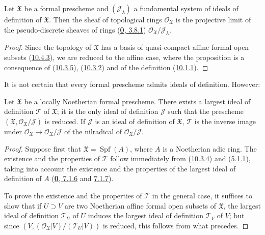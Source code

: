 \begin{proposition}[10.5.3]
\label{I.10.5.3}
Let $\mathfrak{X}$ be a formal prescheme and $(\mathscr{J}_\lambda)$ a
fundamental system of ideals of definition of $\mathfrak{X}$. Then the
sheaf of topological rings $\mathscr{O}_{\mathfrak{X}}$ is the projective
limit of the pseudo-discrete sheaves of rings
\textup{(\hyperref[0.3.8.1]{\textbf{0}, 3.8.1})}
$\mathscr{O}_{\mathfrak{X}}/\mathscr{J}_\lambda$.
\end{proposition}

\begin{proof}
Since the topology of $\mathfrak{X}$ has a basis of quasi-compact affine
formal open subsets (\hyperref[I.10.4.3]{10.4.3}), we are reduced to the
affine case, where the proposition is a consequence of
(\hyperref[I.10.3.5]{10.3.5}),
(\hyperref[I.10.3.2]{10.3.2}) and of the definition
(\hyperref[I.10.1.1]{10.1.1}).
\end{proof}

It is not certain that every formal prescheme admits ideals of
definition. However:

\begin{proposition}[10.5.4]
\label{I.10.5.4}
Let $\mathfrak{X}$ be a locally Noetherian formal prescheme. There exists
a largest ideal of definition $\mathscr{T}$ of $\mathfrak{X}$;
it is the only ideal of definition $\mathscr{J}$ such that the prescheme
$(\mathfrak{X},\mathscr{O}_{\mathfrak{X}}/\mathscr{J})$ is reduced. If
$\mathscr{J}$ is an ideal of definition of $\mathfrak{X}$,
$\mathscr{T}$ is the inverse image under
$\mathscr{O}_{\mathfrak{X}}\to
\mathscr{O}_{\mathfrak{X}}/\mathscr{J}$ of the nilradical of
$\mathscr{O}_{\mathfrak{X}}/\mathscr{J}$.
\end{proposition}

\begin{proof}
Suppose first that $\mathfrak{X}=\operatorname{Spf}(A)$, where $A$ is
a Noetherian adic ring. The existence and the properties of
$\mathscr{T}$ follow immediately from
(\hyperref[I.10.3.4]{10.3.4}) and
(\hyperref[I.5.1.1]{5.1.1}), taking into account the existence and the
properties of the largest ideal of definition of $A$
(\hyperref[0.7.1.6]{\textbf{0}, 7.1.6} and
\hyperref[0.7.1.7]{7.1.7}).

To prove the existence and the properties of $\mathscr{T}$ in the general
case, it suffices to show that if $U\supset V$ are two Noetherian affine
formal open subsets of $\mathfrak{X}$, the largest ideal of
definition $\mathscr{T}_U$ of $U$ induces the largest ideal of definition
$\mathscr{T}_V$ of $V$; but since
$(V,(\mathscr{O}_{\mathfrak{X}}|V)/(\mathscr{T}_U|V))$ is reduced, this
follows from what precedes.
\end{proof}

